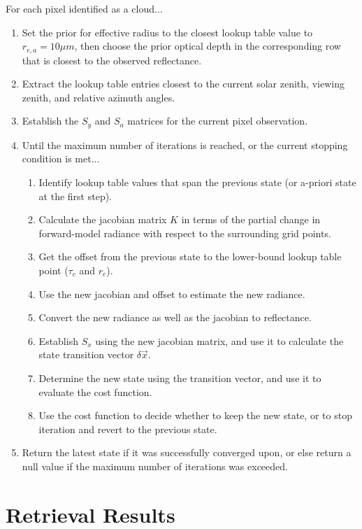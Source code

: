 \documentclass[12pt]{article}
\begin{document}
\noindent
For each pixel identified as a cloud...
\begin{enumerate}
    \item Set the prior for effective radius to the closest lookup table value to $r_{e,a} = 10\mu m$, then choose the prior optical depth in the corresponding row that is closest to the observed reflectance.
    \item Extract the lookup table entries closest to the current solar zenith, viewing zenith, and relative azimuth angles.
    \item Establish the $S_y$ and $S_a$ matrices for the current pixel observation.
    \item Until the maximum number of iterations is reached, or the current stopping condition is met...
        \begin{enumerate}[label*=\arabic*.]
            \item Identify lookup table values that span the previous state (or a-priori state at the first step).
            \item Calculate the jacobian matrix $K$ in terms of the partial change in forward-model radiance with respect to the surrounding grid points.
            \item Get the offset from the previous state to the lower-bound lookup table point ($\tau_c$ and $r_e$).
            \item Use the new jacobian and offset to estimate the new radiance.
            \item Convert the new radiance as well as the jacobian to reflectance.
            \item Establish $S_x$ using the new jacobian matrix, and use it to calculate the state transition vector $\delta \vec{x}$.
            \item Determine the new state using the transition vector, and use it to evaluate the cost function.
            \item Use the cost function to decide whether to keep the new state, or to stop iteration and revert to the previous state.
        \end{enumerate}
    \item Return the latest state if it was successfully converged upon, or else return a null value if the maximum number of iterations was exceeded.
\end{enumerate}

\section{Retrieval Results}
\end{document}

